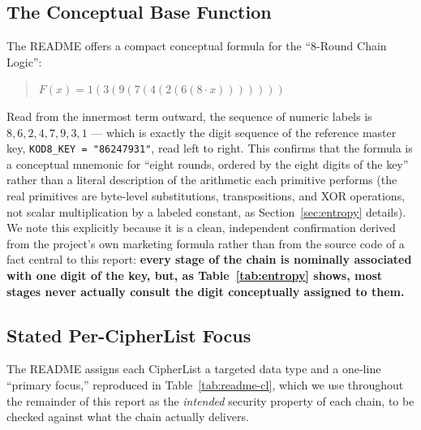 \documentclass[11pt]{article}
\begin{document}
\subsection{The Conceptual Base Function}

The README offers a compact conceptual formula for the ``8-Round Chain
Logic'':

\begin{quote}
\itshape
$F(x) = 1(3(9(7(4(2(6(8 \cdot x)))))))$
\end{quote}

Read from the innermost term outward, the sequence of numeric labels
is $8, 6, 2, 4, 7, 9, 3, 1$ --- which is exactly the digit sequence of
the reference master key, \texttt{KOD8\_KEY = "86247931"}, read left
to right. This confirms that the formula is a conceptual mnemonic for
``eight rounds, ordered by the eight digits of the key'' rather than a
literal description of the arithmetic each primitive performs (the
real primitives are byte-level substitutions, transpositions, and XOR
operations, not scalar multiplication by a labeled constant, as
Section~\ref{sec:entropy} details). We note this explicitly because it
is a clean, independent confirmation derived from the project's own
marketing formula rather than from the source code of a fact central
to this report: \textbf{every stage of the chain is nominally
associated with one digit of the key, but, as Table~\ref{tab:entropy}
shows, most stages never actually consult the digit conceptually
assigned to them.}

\subsection{Stated Per-CipherList Focus}

The README assigns each CipherList a targeted data type and a
one-line ``primary focus,'' reproduced in Table~\ref{tab:readme-cl},
which we use throughout the remainder of this report as the
\emph{intended} security property of each chain, to be checked against
what the chain actually delivers.
\end{document}
